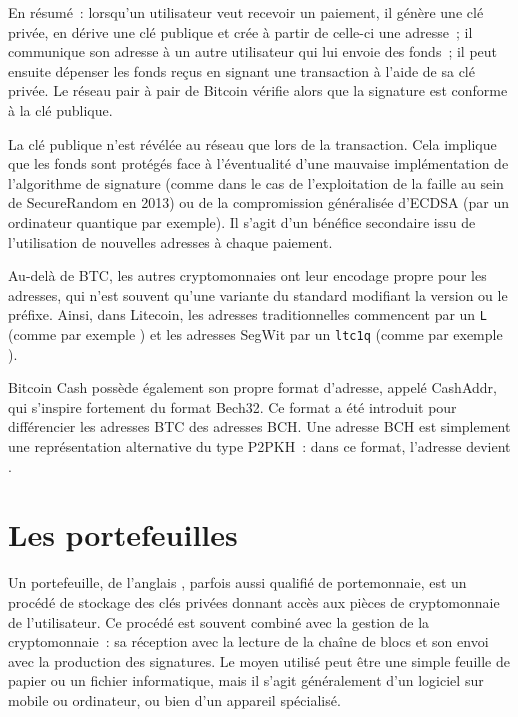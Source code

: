 En résumé~: lorsqu'un utilisateur veut recevoir un paiement, il génère une clé privée, en dérive une clé publique et crée à partir de celle-ci une adresse~; il communique son adresse à un autre utilisateur qui lui envoie des fonds~; il peut ensuite dépenser les fonds reçus en signant une transaction à l'aide de sa clé privée. Le réseau pair à pair de Bitcoin vérifie alors que la signature est conforme à la clé publique.

La clé publique n'est révélée au réseau que lors de la transaction. Cela implique que les fonds sont protégés face à l'éventualité d'une mauvaise implémentation de l'algorithme de signature (comme dans le cas de l'exploitation de la faille au sein de SecureRandom en 2013) ou de la compromission généralisée d'ECDSA (par un ordinateur quantique par exemple). Il s'agit d'un bénéfice secondaire issu de l'utilisation de nouvelles adresses à chaque paiement.

Au-delà de BTC, les autres cryptomonnaies ont leur encodage propre pour les adresses, qui n'est souvent qu'une variante du standard modifiant la version ou le préfixe. Ainsi, dans Litecoin, les adresses traditionnelles commencent par un \texttt{L} (comme par exemple ) et les adresses SegWit par un \texttt{ltc1q} (comme par exemple ).

Bitcoin Cash possède également son propre format d'adresse, appelé CashAddr, qui s'inspire fortement du format Bech32. Ce format a été introduit pour différencier les adresses BTC des adresses BCH. Une adresse BCH est simplement une représentation alternative du type P2PKH~: dans ce format, l'adresse  devient .

\section*{Les portefeuilles}


Un portefeuille, de l'anglais , parfois aussi qualifié de portemonnaie, est un procédé de stockage des clés privées donnant accès aux pièces de cryptomonnaie de l'utilisateur. Ce procédé est souvent combiné avec la gestion de la cryptomonnaie~: sa réception avec la lecture de la chaîne de blocs et son envoi avec la production des signatures. Le moyen utilisé peut être une simple feuille de papier ou un fichier informatique, mais il s'agit généralement d'un logiciel sur mobile ou ordinateur, ou bien d'un appareil spécialisé.

